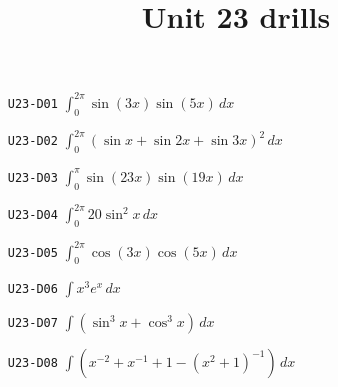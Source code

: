 \title{Unit 23 drills}\maketitle\begin{enumerate}
  \item[\texttt{U23-D01}] $\displaystyle \int_{0}^{2\pi}\sin(3x)\sin(5x)\,dx$
  \item[\texttt{U23-D02}] $\displaystyle \int_{0}^{2\pi}(\sin x+\sin 2x+\sin 3x)^{2}\,dx$
  \item[\texttt{U23-D03}] $\displaystyle \int_{0}^{\pi}\sin(23x)\sin(19x)\,dx$
  \item[\texttt{U23-D04}] $\displaystyle \int_{0}^{2\pi}20\sin^{2}x\,dx$
  \item[\texttt{U23-D05}] $\displaystyle \int_{0}^{2\pi}\cos(3x)\cos(5x)\,dx$
  \item[\texttt{U23-D06}] $\displaystyle \int x^{3}e^{x}\,dx$
  \item[\texttt{U23-D07}] $\displaystyle \int(\sin^{3}x+\cos^{3}x)\,dx$
  \item[\texttt{U23-D08}] $\displaystyle \int(x^{-2}+x^{-1}+1-(x^{2}+1)^{-1})\,dx$
\end{enumerate}

